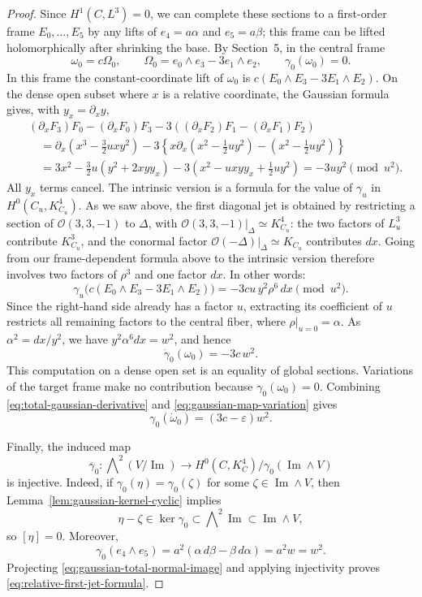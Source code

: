 \documentclass[10pt,a4paper]{amsart}
\newcommand{\OO}{\mathcal O}
\begin{document}
\begin{proof}
Since $H^1(C,L^3)=0$, we can complete these sections to a first-order frame
$E_0,\ldots,E_5$ by any lifts of $e_4=a\alpha$ and $e_5=a\beta$;
this frame can be lifted holomorphically after shrinking the {base}.
By Section~5, in the central frame
\[
\omega_0=c\Omega_0,\qquad
\Omega_0=e_0\wedge e_3-3e_1\wedge e_2,
\qquad\gamma_0(\omega_0)=0.
\]
In this frame the constant-coordinate lift of $\omega_0$ is
$c(E_0\wedge E_3-3E_1\wedge E_2)$. On the dense open subset where
$x$ is a relative coordinate, the Gaussian formula gives, with
$y_x=\partial_xy$,
{
\[
\begin{aligned}
&(\partial_x F_3) F_0 -(\partial_x F_0) F_3 -3((\partial_x F_2) F_1 - (\partial_x F_1) F_2) \\
&\quad=\partial_x\left(x^3-\tfrac32uxy^2\right)
-3\left\{x\partial_x\left(x^2-\tfrac12uy^2\right)
-\left(x^2-\tfrac12uy^2\right)\right\}\\
&\quad=3x^2-\tfrac32u(y^2+2xyy_x)
-3\left(x^2-uxyy_x+\tfrac12uy^2\right)
=-3uy^2\pmod{u^2}.
\end{aligned}
\]}
All $y_x$ terms cancel.
{The intrinsic version is a formula for the value of $\gamma_u$ in
$H^0(C_u,K_{C_u}^4)$.
As we saw above, the first diagonal jet is obtained by restricting
a section of $\OO(3,3,-1)$ to $\Delta$, with
$\OO(3,3,-1)|_\Delta\simeq K_{C_u}^4$:
the two factors of $L_u^3$ contribute $K_{C_u}^3$,
and the conormal factor $\OO(-\Delta)|_\Delta\simeq K_{C_u}$
contributes $dx$.
Going from our frame-dependent formula above to the intrinsic version
therefore involves two factors of $\rho^3$ and one factor $dx$.
In other words:}
\[
\gamma_u\bigl(c(E_0\wedge E_3-3E_1\wedge E_2)\bigr)
=-3cu\,y^2\rho^6\,dx\pmod{u^2}.
\]
Since the right-hand side already has a factor $u$, extracting its
coefficient of $u$ restricts all remaining factors to the central fiber,
where $\rho|_{u=0}=\alpha$. As $\alpha^2=dx/y^2$, we have
$y^2\alpha^6dx=w^2$, and hence
\begin{equation}
\label{eq:gaussian-map-variation}
\dot\gamma_0(\omega_0)=-3c\,w^2.
\end{equation}
This computation on a dense open set is an equality of global
sections. Variations of the target frame make no contribution because
$\gamma_0(\omega_0)=0$. Combining
\eqref{eq:total-gaussian-derivative} and
\eqref{eq:gaussian-map-variation} gives
\begin{equation}
\label{eq:gaussian-total-normal-image}
\gamma_0(\dot\omega_0)=(3c-\varepsilon)w^2.
\end{equation}

Finally, the induced map
\[
\overline\gamma_0:
\bigwedge\nolimits^2(V/\operatorname{Im})
\longrightarrow H^0(C,K_C^4)/\gamma_0(\operatorname{Im}\wedge V)
\]
is injective. Indeed, if $\gamma_0(\eta)=\gamma_0(\zeta)$ for some
$\zeta\in\operatorname{Im}\wedge V$, then
Lemma~\ref{lem:gaussian-kernel-cyclic} implies
\[
\eta-\zeta\in\ker\gamma_0
\subset\bigwedge\nolimits^2\operatorname{Im}
\subset\operatorname{Im}\wedge V,
\]
so $[\eta]=0$. Moreover,
\[
\gamma_0(e_4\wedge e_5)
=a^2(\alpha\,d\beta-\beta\,d\alpha)=a^2w=w^2.
\]
Projecting \eqref{eq:gaussian-total-normal-image} and applying
injectivity proves \eqref{eq:relative-first-jet-formula}.
\end{proof}
\endgroup
\end{document}
